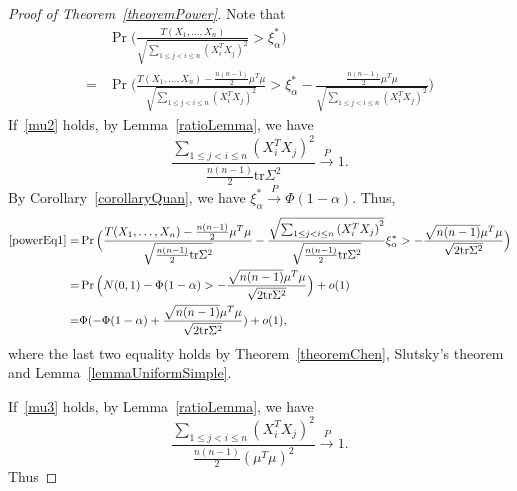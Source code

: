 \documentclass[review]{elsarticle}
\theoremstyle{plain}
\theoremstyle{definition}
\theoremstyle{remark}
\begin{document}
\begin{proof}[Proof of Theorem~\ref{theoremPower}]
    Note that
    \begin{align}
            &\Pr\Big(\frac{T( X_1,\ldots, X_n)}{\sqrt{\sum_{1\leq j<i\leq n}{(X_i^T X_j)}^2}}>\xi_{\alpha}^* \Big)\nonumber\\
            =&
            \Pr\Big(\frac{T( X_1,\ldots, X_n)-\frac{n(n-1)}{2}\mu^T\mu}{\sqrt{\sum_{1\leq j<i\leq n}{(X_i^T X_j)}^2}}>\xi_{\alpha}^*-\frac{\frac{n(n-1)}{2}\mu^T\mu}{\sqrt{\sum_{1\leq j<i\leq n}{(X_i^T X_j)}^2}} \Big)
            \label{powerEq1}
    \end{align}
    If~\eqref{mu2} holds, by Lemma~\ref{ratioLemma}, we have
    $$
    \frac{\sum_{1\leq j< i\leq n}(X_i^T X_j)^2}{\frac{n(n-1)}{2}\mathrm{tr}\Sigma^2}\xrightarrow{P}1.
    $$
    By Corollary~\ref{corollaryQuan}, we have $\xi_{\alpha}^*\xrightarrow{P} \Phi(1-\alpha)$.
Thus,
    \begin{equation*}
        \begin{aligned}
            \eqref{powerEq1}=&
            \Pr\Big(\frac{T( X_1,\ldots, X_n)-\frac{n(n-1)}{2}\mu^T\mu}{\sqrt{\frac{n(n-1)}{2}\mathrm{tr}\Sigma^2}}-
            \frac{\sqrt{\sum_{1\leq j<i\leq n}{(X_i^T X_j)}^2}}{\sqrt{\frac{n(n-1)}{2}\mathrm{tr}\Sigma^2}}\xi_{\alpha}^*>
            -\frac{\sqrt{n(n-1)}\mu^T\mu}{\sqrt{2\mathrm{tr}\Sigma^2}} \Big)\\
            =&
            \Pr\Big(N(0,1)-\Phi(1-\alpha)>-\frac{\sqrt{n(n-1)}\mu^T\mu}{\sqrt{2\mathrm{tr}\Sigma^2}}\Big)+o(1)\\
            =&
            \Phi(-\Phi(1-\alpha)+\frac{\sqrt{n(n-1)}\mu^T\mu}{\sqrt{2\mathrm{tr}\Sigma^2}})+o(1),
        \end{aligned}
    \end{equation*}
    where the last two equality holds by Theorem~\ref{theoremChen}, Slutsky's theorem and Lemma~\ref{lemmaUniformSimple}.

    If~\eqref{mu3} holds, by Lemma~\ref{ratioLemma}, we have
    $$
    \frac{\sum_{1\leq j< i\leq n}(X_i^T X_j)^2}{\frac{n(n-1)}{2}{(\mu^T\mu)}^2}\xrightarrow{P}1.
    $$
    Thus
            

\end{proof}
\end{document}
